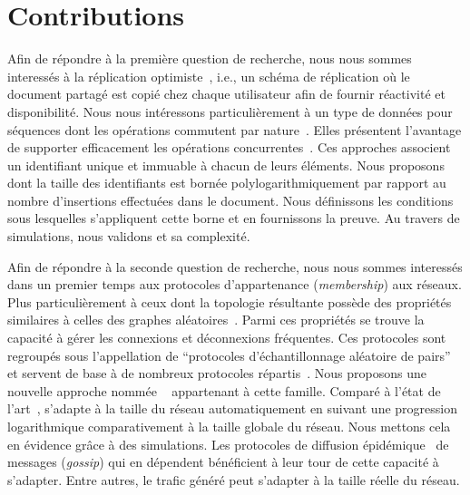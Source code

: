
\section{Contributions}

Afin de répondre à la première question de recherche, nous nous sommes interessés
à la réplication optimiste~\cite{demers1987epidemic, saito2005optimistic}, i.e.,
un schéma de réplication où le document partagé est copié chez chaque
utilisateur afin de fournir réactivité et disponibilité. Nous nous intéressons
particulièrement à un type de données pour séquences dont les opérations
commutent par nature~\cite{burckhardt2014replicated, shapiro2011comprehensive,
  shapiro2011conflict, zawirski2015dependable}. Elles présentent l'avantage de
supporter efficacement les opérations concurrentes~\cite{ahmed2015evaluation,
  ahmed2011evaluating}. Ces approches associent un identifiant unique et
immuable à chacun de leurs éléments. Nous proposons
\LSEQ~\cite{nedelec2013concurrency, nedelec2013lseq} dont la taille des
identifiants est bornée polylogarithmiquement par rapport au nombre d'insertions
effectuées dans le document. Nous définissons les conditions sous lesquelles
s'appliquent cette borne et en fournissons la preuve. Au travers de simulations,
nous validons \LSEQ et sa complexité.

Afin de répondre à la seconde question de recherche, nous nous sommes
interessés dans un premier temps aux protocoles d'appartenance
(\emph{membership}) aux réseaux. Plus particulièrement à ceux dont la topologie
résultante possède des propriétés similaires à celles des graphes
aléatoires~\cite{erdos1959random}. Parmi ces propriétés se trouve la capacité à
gérer les connexions et déconnexions fréquentes. Ces protocoles sont regroupés
sous l'appellation de ``protocoles d'échantillonnage aléatoire de
pairs''~\cite{jelasity2004peer, jelasity2007gossip} et servent de base à de
nombreux protocoles répartis~\cite{dabek2004vivaldi, folz2016cyclades,
  montresor2005chord}. Nous proposons une nouvelle approche nommée
\SPRAY~\cite{nedelec2015spray} appartenant à cette famille. Comparé à l'état de
l'art~\cite{eugster2003lightweight, ganesh2001scamp, jelasity2007gossip,
  leitao2007dependable, tolgyeski2009adaptive, voulgaris2005cyclon}, \SPRAY
s'adapte à la taille du réseau automatiquement en suivant une progression
logarithmique comparativement à la taille globale du réseau. Nous mettons cela
en évidence grâce à des simulations.  Les protocoles de diffusion
épidémique~\cite{birman1999bimodal} de messages (\emph{gossip}) qui en dépendent
bénéficient à leur tour de cette capacité à s'adapter. Entre autres, le trafic
généré peut s'adapter à la taille réelle du réseau.

